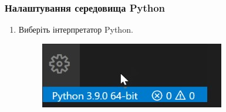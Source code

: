 \documentclass[a4paper,12pt]{article}
\begin{document}
    \subsubsection{Налаштування середовища Python}
    \begin{enumerate}
        \item Виберіть інтерпретатор Python.
        \begin{figure}[h!]
            \begin{center}
                \includegraphics[scale=0.7]{Prt sc/Figure_10.jpg}
            \end{center}
        \end{figure}


\end{enumerate}
\end{document}
